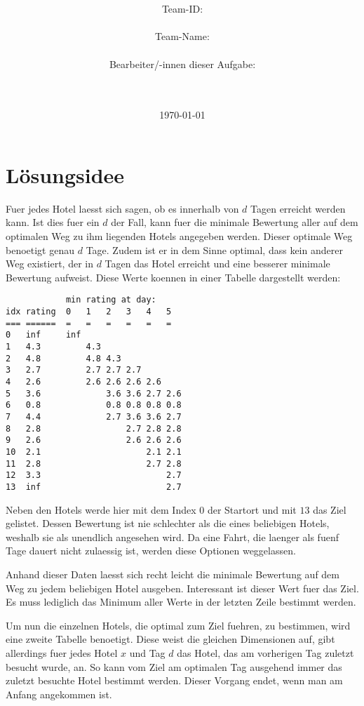\documentclass[a4paper,10pt,ngerman]{scrartcl}
\title{\textbf{\Huge\Aufgabe}}
\author{\LARGE Team-ID: \LARGE \TeamId \\\\
	    \LARGE Team-Name: \LARGE \TeamName \\\\
	    \LARGE Bearbeiter/-innen dieser Aufgabe: \\ 
	    \LARGE \Namen\\\\}
\date{\LARGE\today}
\begin{document}
\maketitle
\tableofcontents

\vspace{0.5cm}

\section{Lösungsidee}
Fuer jedes Hotel laesst sich sagen, ob es innerhalb von $d$ Tagen erreicht werden kann.
Ist dies fuer ein $d$ der Fall, kann fuer die minimale Bewertung aller auf dem optimalen Weg zu ihm liegenden Hotels angegeben werden.
Dieser optimale Weg benoetigt genau $d$ Tage.
Zudem ist er in dem Sinne optimal, dass kein anderer Weg existiert, der in $d$ Tagen das Hotel erreicht und eine besserer minimale Bewertung aufweist.
Diese Werte koennen in einer Tabelle dargestellt werden:
\begin{lstlisting}
            min rating at day:
idx rating  0   1   2   3   4   5
=== ======  =   =   =   =   =   =
0   inf     inf
1   4.3         4.3
2   4.8         4.8 4.3
3   2.7         2.7 2.7 2.7
4   2.6         2.6 2.6 2.6 2.6
5   3.6             3.6 3.6 2.7 2.6
6   0.8             0.8 0.8 0.8 0.8
7   4.4             2.7 3.6 3.6 2.7
8   2.8                 2.7 2.8 2.8
9   2.6                 2.6 2.6 2.6
10  2.1                     2.1 2.1
11  2.8                     2.7 2.8
12  3.3                         2.7
13  inf                         2.7
\end{lstlisting}
Neben den Hotels werde hier mit dem Index $0$ der Startort und mit $13$ das Ziel gelistet.
Dessen Bewertung ist nie schlechter als die eines beliebigen Hotels, weshalb sie als unendlich angesehen wird.
Da eine Fahrt, die laenger als fuenf Tage dauert nicht zulaessig ist, werden diese Optionen weggelassen.

Anhand dieser Daten laesst sich recht leicht die minimale Bewertung auf dem Weg zu jedem beliebigen Hotel ausgeben.
Interessant ist dieser Wert fuer das Ziel.
Es muss lediglich das Minimum aller Werte in der letzten Zeile bestimmt werden.

Um nun die einzelnen Hotels, die optimal zum Ziel fuehren, zu bestimmen, wird eine zweite Tabelle benoetigt.
Diese weist die gleichen Dimensionen auf, gibt allerdings fuer jedes Hotel $x$ und Tag $d$ das Hotel, das am vorherigen Tag zuletzt besucht wurde, an.
So kann vom Ziel am optimalen Tag ausgehend immer das zuletzt besuchte Hotel bestimmt werden.
Dieser Vorgang endet, wenn man am Anfang angekommen ist.
\end{document}
